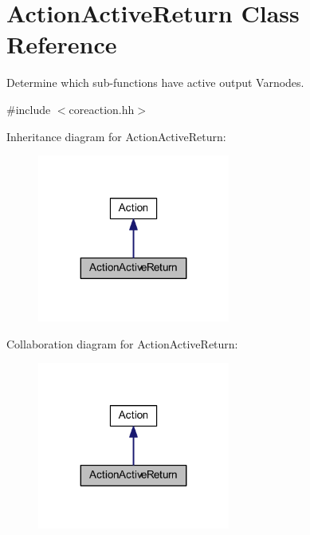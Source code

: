 \hypertarget{class_action_active_return}{}\section{Action\+Active\+Return Class Reference}
\label{class_action_active_return}


Determine which sub-\/functions have active output Varnodes.  




{\ttfamily \#include $<$coreaction.\+hh$>$}



Inheritance diagram for Action\+Active\+Return\+:
\nopagebreak
\begin{figure}[H]
\begin{center}
\leavevmode
\includegraphics[width=179pt]{class_action_active_return__inherit__graph}
\end{center}
\end{figure}


Collaboration diagram for Action\+Active\+Return\+:
\nopagebreak
\begin{figure}[H]
\begin{center}
\leavevmode
\includegraphics[width=179pt]{class_action_active_return__coll__graph}
\end{center}
\end{figure}
